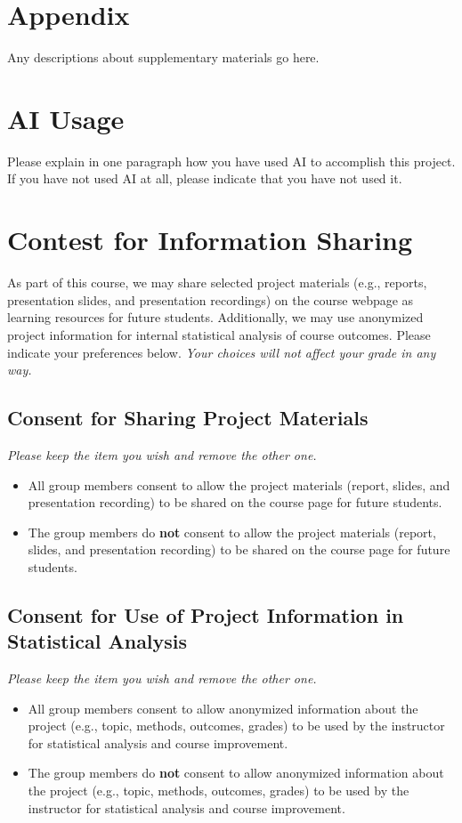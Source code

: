 \documentclass{article}
\begin{document}
\section*{Appendix}
Any descriptions about supplementary materials go here.


\newpage
\section*{AI Usage}
Please explain in one paragraph how you have used AI to accomplish this project. If you have not used AI at all, please indicate that you have not used it. 

\section*{Contest for Information Sharing}
As part of this course, we may share selected project materials (e.g., reports, presentation slides, and presentation recordings) on the course webpage as learning resources for future students. Additionally, we may use anonymized project information for internal statistical analysis of course outcomes. Please indicate your preferences below. \textit{Your choices will not affect your grade in any way.}

\subsection*{Consent for Sharing Project Materials}
\textit{Please keep the item you wish and remove the other one.}

\begin{itemize}
	\item All group members consent to allow the project materials (report, slides, and presentation recording) to be shared on the course page for future students.
	\item The group members do \textbf{not} consent to allow the project materials (report, slides, and presentation recording) to be shared on the course page for future students.
\end{itemize}

\subsection*{Consent for Use of Project Information in Statistical Analysis}
\textit{Please keep the item you wish and remove the other one.}
\begin{itemize}
	\item All group members consent to allow anonymized information about the project (e.g., topic, methods, outcomes, grades) to be used by the instructor for statistical analysis and course improvement.
	\item The group members do \textbf{not} consent to allow anonymized information about the project (e.g., topic, methods, outcomes, grades) to be used by the instructor for statistical analysis and course improvement.
\end{itemize}
\end{document}
